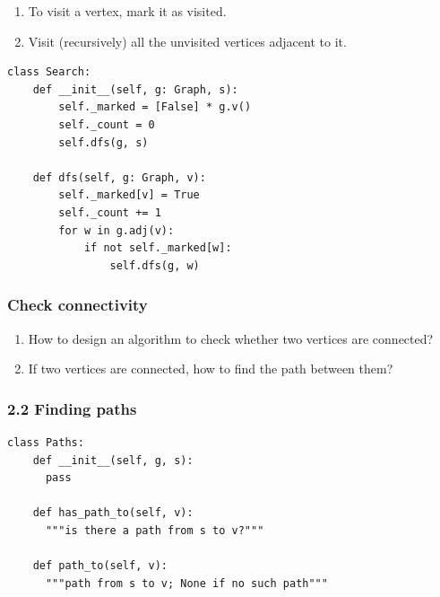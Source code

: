 \documentclass[aspectratio=169, 14pt]{beamer}
\begin{document}
\begin{frame}[fragile]
	\begin{enumerate}
		\item To visit a vertex, mark it as visited.
		\item Visit (recursively) all the unvisited vertices adjacent to it.
	\end{enumerate}
	\begin{verbatim}
class Search:
    def __init__(self, g: Graph, s):
        self._marked = [False] * g.v()
        self._count = 0
        self.dfs(g, s)

    def dfs(self, g: Graph, v):
        self._marked[v] = True
        self._count += 1
        for w in g.adj(v):
            if not self._marked[w]:
                self.dfs(g, w)
  \end{verbatim}
\end{frame}

\begin{frame}[fragile]
	\frametitle{Check connectivity}
	\begin{enumerate}
		\item How to design an algorithm to check whether two vertices are connected?
		\item If two vertices are connected, how to find the path between them?
	\end{enumerate}
\end{frame}

\begin{frame}[fragile]
	\frametitle{2.2 Finding paths}

	\begin{verbatim}
class Paths:
    def __init__(self, g, s):
      pass

    def has_path_to(self, v):
      """is there a path from s to v?"""

    def path_to(self, v):
      """path from s to v; None if no such path"""
  \end{verbatim}
\end{frame}
\end{document}
